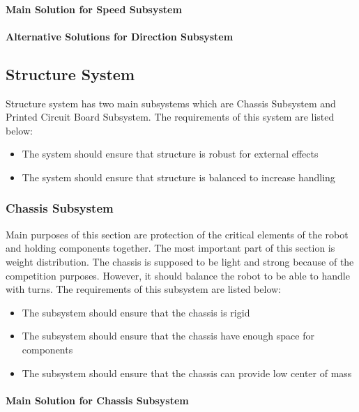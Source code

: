 \documentclass[a4paper,12pt]{article}
\begin{document}
	\paragraph{Main Solution for Speed Subsystem}
	
	\paragraph{Alternative Solutions for Direction Subsystem}
	
	
	
	\subsection{Structure System}
	
	Structure system has two main subsystems which are Chassis Subsystem and Printed Circuit Board Subsystem. The requirements of this system are listed below:
	\begin{itemize}
		\item The system should	ensure that structure is robust for external effects 
		\item The system should	ensure that structure is balanced to increase handling
		
	\end{itemize}
	
	
	
	\subsubsection{Chassis Subsystem}
	Main purposes of this section are protection of the critical elements of the robot and holding components together. The most important part of this section is weight distribution. The chassis is supposed to be light and strong because of the competition purposes. However, it should balance the robot to be able to handle with turns. The requirements of this subsystem are listed below:
	\begin{itemize}
		\item The subsystem should ensure that the chassis is rigid 
		\item The subsystem should ensure that the chassis have enough space for components
		\item The subsystem should ensure that the chassis can provide low center of mass 
	\end{itemize}
	
	\paragraph{Main Solution for Chassis Subsystem}
	
\end{document}
